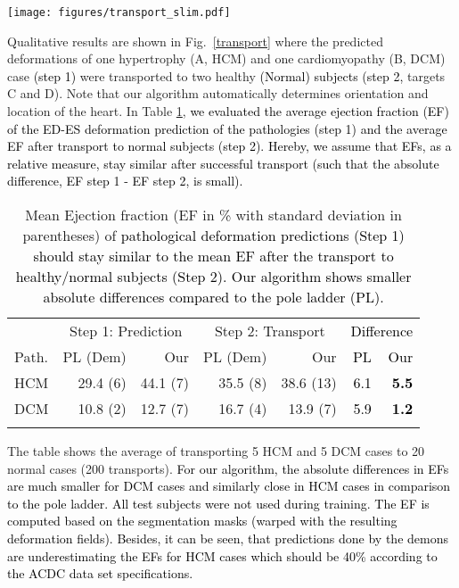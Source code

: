 \documentclass[journal]{IEEEtran}
\newcommand{\update}[1]{\textcolor{black}{#1}}
\begin{document}
\begin{figure*}[tb]
\centering 
\texttt{[image: figures/transport\_slim.pdf]}
\caption{\small{Transport pathological deformation predictions (\update{Step 1,} hypertrophy HCM, myopathy DCM) to healthy (Normal) subjects by using the pole ladder (with LCC-demons) and our probabilistic method \update{(Step 2)}. Note that the pole ladder algorithm requires the registration between pathological and normal subjects while our approach is able to rotate and translate deformations encoded in the latent space  automatically.}}\label{transport}
\end{figure*}
Qualitative results are shown in Fig.~\ref{transport} where the predicted deformations of one hypertrophy (A, HCM) and one cardiomyopathy (B, DCM) case \update{(step 1)} were transported to two healthy \update{(Normal) subjects (step 2,} targets C and D). Note that our algorithm automatically determines orientation and location of the heart. In Table \ref{transportEFTable}, \update{we evaluated the average ejection fraction (EF) of the ED-ES deformation prediction of the pathologies (step 1) and the average EF after transport to normal subjects (step 2). Hereby, we assume that EFs, as a relative measure, stay similar after successful transport (such that the absolute difference, EF step 1 - EF step 2, is small).} 
\begin{table}[h]
\centering
\caption{\small{Mean Ejection fraction (EF in \% with standard deviation in parentheses) of \update{pathological deformation predictions (Step 1) should stay similar to the mean EF after the transport to healthy/normal subjects (Step 2). Our algorithm shows smaller absolute differences compared to the pole ladder (PL).}}}\label{transportEFTable}
\begin{tabular}{l|rr|rr|rr}
& \multicolumn{2}{c}{Step 1: Prediction} & \multicolumn{2}{c}{Step 2: Transport} & \multicolumn{2}{c}{\update{Difference}} \\
Path. & PL (Dem) & Our & PL (Dem) & Our & \update{PL} & \update{Our} \\
\hline
HCM & 29.4 (6) & 44.1 (7) & 35.5 (8) & 38.6 (13) & \update{6.1} & \update{\bf{5.5}}\\ 
DCM & 10.8 (2) & 12.7 (7) & 16.7 (4) & 13.9 (7) & \update{5.9} & \update{\bf{1.2}}\\ 
\noalign{\smallskip}
\hline
\end{tabular}
\end{table}
The table shows the average of transporting 5 HCM and 5 DCM cases to 20 normal cases (200 transports).
\update{For our algorithm, the absolute differences in EFs are much smaller for DCM cases and similarly close in HCM cases in comparison to the pole ladder. }\update{All test subjects were not used during training. The EF is computed based on the segmentation masks (warped with the resulting deformation fields). Besides, it can be seen, that predictions done by the demons are underestimating the EFs for HCM cases which should be 40\% according to the ACDC data set specifications.} 
\end{document}
